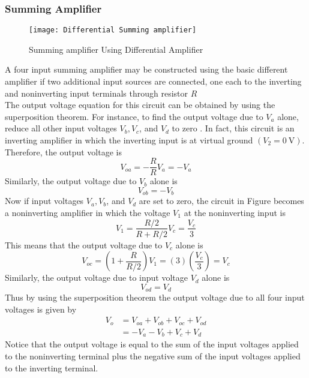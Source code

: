    \subsubsection{Summing Amplifier}
   \begin{figure}[H]
   	\centering
   	\texttt{[image: Differential Summing amplifier]}
   	\caption{Summing amplifier Using Differential Amplifier}
   	\label{Differential Summing amplifier}
   \end{figure}
   A four input summing amplifier may be constructed using the basic different amplifier if two additional input sources are connected, one each to the inverting and noninverting input terminals through resistor $R$\\ The output voltage equation for this circuit can be obtained by using the superposition theorem. For instance, to find the output voltage due to $V_{a}$ alone, reduce all other input voltages $V_{b}, V_{c}$, and $V_{d}$ to zero . In 
   fact, this circuit is an inverting amplifier in which the inverting input is at virtual ground $\left(V_{2}=0 \mathrm{~V}\right)$. Therefore, the output voltage is
   $$V_{o a}=-\frac{R}{R} V_{a}=-V_{a}$$
   Similarly, the output voltage due to $V_{b}$ alone is
   $$
   V_{o b}=-V_{b}
   $$
   Now if input voltages $V_{a}, V_{b}$, and $V_{d}$ are set to zero, the circuit in Figure  becomes a noninverting amplifier in which the voltage $V_{1}$ at the noninverting input is
   $$V_{1}=\frac{R / 2}{R+R / 2} V_{c}=\frac{V_{c}}{3}$$
   This means that the output voltage due to $V_{c}$ alone is
   $$
   V_{o c}=\left(1+\frac{R}{R / 2}\right) V_{1}=(3)\left(\frac{V_{c}}{3}\right)=V_{c}
   $$
   Similarly, the output voltage due to input voltage $V_{d}$ alone is
   $$
   V_{o d}=V_{d}
   $$
   Thus by using the superposition theorem the output voltage due to all four input voltages is given by
   $$
   \begin{aligned}
   V_{o} &=V_{o a}+V_{o b}+V_{o c}+V_{o d} \\
   &=-V_{a}-V_{b}+V_{c}+V_{d}
   \end{aligned}
   $$
   Notice that the output voltage is equal to the sum of the input voltages applied to the noninverting terminal plus the negative sum of the input voltages applied to the inverting terminal.
